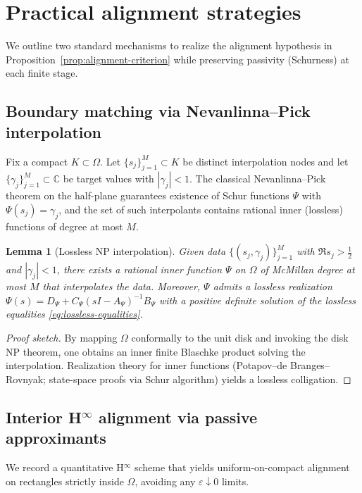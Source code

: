 \documentclass[11pt]{article}
\newtheorem{lemma}[theorem]{Lemma}
\theoremstyle{remark}
\newcommand{\C}{\mathbb{C}}
\begin{document}
\section{Practical alignment strategies}\label{sec:practical-alignment}
We outline two standard mechanisms to realize the alignment hypothesis in Proposition~\ref{prop:alignment-criterion} while preserving passivity (Schurness) at each finite stage.

\subsection{Boundary matching via Nevanlinna--Pick interpolation}
Fix a compact \(K\subset\Omega\). Let \(\{s_j\}_{j=1}^{M}\subset K\) be distinct interpolation nodes and let \(\{\gamma_j\}_{j=1}^{M}\subset\C\) be target values with \(|\gamma_j|<1\). The classical Nevanlinna--Pick theorem on the half-plane guarantees existence of Schur functions \(\Psi\) with \(\Psi(s_j)=\gamma_j\), and the set of such interpolants contains rational inner (lossless) functions of degree at most \(M\).

\begin{lemma}[Lossless NP interpolation]\label{lem:NP-lossless}
Given data \(\{(s_j,\gamma_j)\}_{j=1}^{M}\) with \(\Re s_j>\tfrac12\) and \(|\gamma_j|<1\), there exists a rational inner function \(\Psi\) on \(\Omega\) of McMillan degree at most \(M\) that interpolates the data. Moreover, \(\Psi\) admits a lossless realization \(\Psi(s)=D_\Psi+C_\Psi(sI-A_\Psi)^{-1}B_\Psi\) with a positive definite solution of the lossless equalities \eqref{eq:lossless-equalities}.
\end{lemma}
\begin{proof}[Proof sketch]
By mapping \(\Omega\) conformally to the unit disk and invoking the disk NP theorem, one obtains an inner finite Blaschke product solving the interpolation. Realization theory for inner functions (Potapov--de Branges--Rovnyak; state-space proofs via Schur algorithm) yields a lossless colligation.
\end{proof}

\subsection{Interior H$^\infty$ alignment via passive approximants}\label{subsec:hinf-passive}
We record a quantitative H$^\infty$ scheme that yields uniform-on-compact alignment on rectangles strictly inside \(\Omega\), avoiding any \(\varepsilon\downarrow 0\) limits.
\end{document}
